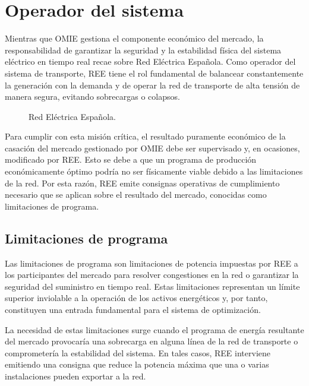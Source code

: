 \section{Operador del sistema}
\label{makereference4.2}

Mientras que OMIE gestiona el componente económico del mercado, la responsabilidad de garantizar la seguridad y la estabilidad física del sistema eléctrico en tiempo real recae sobre Red Eléctrica Española. Como operador del sistema de transporte, REE tiene el rol fundamental de balancear constantemente la generación con la demanda y de operar la red de transporte de alta tensión de manera segura, evitando sobrecargas o colapsos.

\begin{figure}
  \centering
  \caption{Red Eléctrica Española.}
  \label{fig:ree}
\end{figure}

Para cumplir con esta misión crítica, el resultado puramente económico de la casación del mercado gestionado por OMIE debe ser supervisado y, en ocasiones, modificado por REE. Esto se debe a que un programa de producción económicamente óptimo podría no ser físicamente viable debido a las limitaciones de la red. Por esta razón, REE emite consignas operativas de cumplimiento necesario que se aplican sobre el resultado del mercado, conocidas como limitaciones de programa.

\subsection{Limitaciones de programa}
\label{makereference4.2.1}

Las limitaciones de programa son limitaciones de potencia impuestas por REE a los participantes del mercado para resolver congestiones en la red o garantizar la seguridad del suministro en tiempo real. Estas limitaciones representan un límite superior inviolable a la operación de los activos energéticos y, por tanto, constituyen una entrada fundamental para el sistema de optimización.

La necesidad de estas limitaciones surge cuando el programa de energía resultante del mercado provocaría una sobrecarga en alguna línea de la red de transporte o comprometería la estabilidad del sistema. En tales casos, REE interviene emitiendo una consigna que reduce la potencia máxima que una o varias instalaciones pueden exportar a la red.

